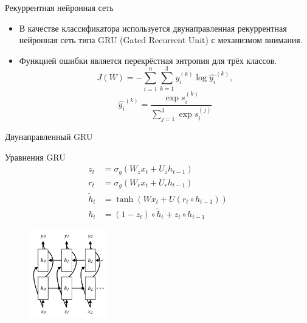 \documentclass{beamer}
\begin{document}
\begin{frame}{Рекуррентная нейронная сеть}
	\begin{itemize}
	\item В качестве классификатора используется двунаправленная рекуррентная нейронная сеть типа GRU (Gated Recurrent Unit) с механизмом внимания.\\
	\item Функцией ошибки является перекрёстная энтропия для трёх классов.\\
	$$ J(W)=-\sum_{i=1}^{n}\sum_{k=1}^{3}y_{i}^{(k)}\log{\hat{y_{i}}^{(k)}},
	$$$$
	\hat{y_{i}}^{(k)} = \frac{\exp{s_{i}^{(k)}}}{\sum_{j=1}^{3}\exp{s_{i}^{(j)}}}
	$$
	\end{itemize}

\end{frame}
\begin{frame}{Двунаправленный GRU}
	\begin{block}{Уравнения GRU}
	\begin{align}
	z_{t}&=\sigma_{g}(W_{z}x_{t}+U_{z}h_{t-1})\\
	r_{t}&=\sigma_{g}(W_{r}x_{t}+U_{r}h_{t-1})\\
	\tilde{h}_{t}&=\tanh(Wx_{t}+U(r_{t}\circ h_{t-1}))\\
	h_{t}&=(1-z_{t})\circ \tilde{h}_{t}+z_{t}\circ h_{t-1}
	\end{align}	

	\end{block}
\begin{figure}[!h]
  \includegraphics[width=0.3\textwidth]{images/birnn2_bin.png}
\end{figure}
\end{frame}
\end{document}
